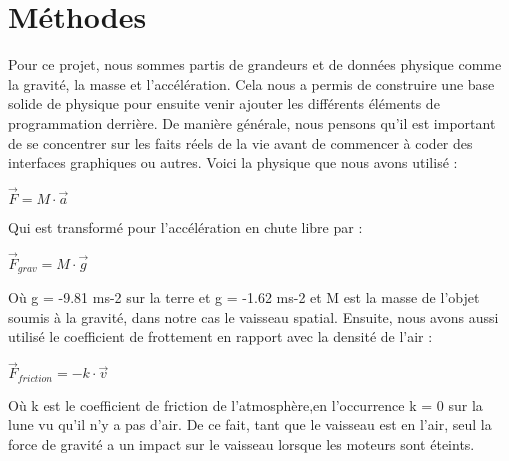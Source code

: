 \section{Méthodes}

Pour ce projet, nous sommes partis de grandeurs et de données physique comme la gravité, la masse et l'accélération. Cela nous a permis de construire une base solide de physique pour ensuite venir ajouter les différents éléments de programmation derrière. De manière générale, nous pensons qu'il est important de se concentrer sur les faits réels de la vie avant de commencer à coder des interfaces graphiques ou autres.
Voici la physique que nous avons utilisé :  
\begin{center}
$\overrightarrow{F}= M \cdot \overrightarrow{a}$\\
\end{center}
Qui est transformé pour l’accélération en chute libre par :
\begin{center}
$\overrightarrow{F}_{grav} = M \cdot \overrightarrow{g}$\\
\end{center}
Où g = -9.81 ms-2 sur la terre et g = -1.62 ms-2 et M est la masse de l’objet soumis à la gravité, dans notre cas le vaisseau spatial.
Ensuite, nous avons aussi utilisé le coefficient de frottement en rapport avec la densité de l’air :
\begin{center}
$\overrightarrow{F}_{friction} = -k \cdot \overrightarrow{v}$\\
\end{center}
Où k est le coefficient de friction de l'atmosphère,en l'occurrence k = 0 sur la lune vu qu'il n'y a pas d'air. De ce fait, tant que le vaisseau est en l'air, seul la force de gravité a un impact sur le vaisseau lorsque les moteurs sont éteints.\\
